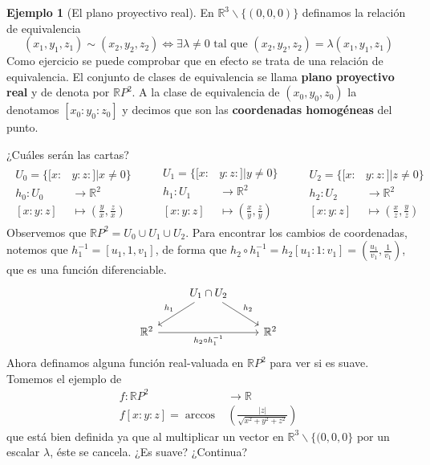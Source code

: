\documentclass[spanish]{book}
\theoremstyle{definition}
\newtheorem*{ejem}{Ejemplo}
\newcommand{\R}{\mathbb{R}}
\begin{document}
	\begin{ejem}[El plano proyectivo real]
		En $\R^3\backslash\{(0,0,0)\}$ definamos la relación de equivalencia
		\[(x_1,y_1,z_1)\sim(x_2,y_2,z_2)\iff\exists\lambda\neq0\text{ tal que }(x_2,y_2,z_2)=\lambda(x_1,y_1,z_1)\]
		Como ejercicio se puede comprobar que en efecto se trata de una relación de equivalencia. El conjunto de clases de equivalencia se llama \textbf{plano proyectivo real} y de denota por $\R P^2$. A la clase de equivalencia de $(x_0,y_0,z_0)$ la denotamos $[x_0:y_0:z_0]$ y decimos que son las \textbf{coordenadas homogéneas} del punto.
		
		¿Cuáles serán las cartas?
		\begin{align*}
			\begin{aligned}
				U_0=\{[x:&y:z:]|x\neq0\}\\
				h_0:U_0&\to\R^2\\
				[x:y:z]&\mapsto\left(\frac{y}{x},\frac{z}{x}\right)
			\end{aligned}\qquad
			\begin{aligned}
				U_1=\{[x:&y:z:]|y\neq0\}\\
				h_1:U_1&\to\R^2\\
				[x:y:z]&\mapsto\left(\frac{x}{y},\frac{z}{y}\right)
			\end{aligned}\qquad
			\begin{aligned}
				U_2=\{[x:&y:z:]|z\neq0\}\\
				h_2:U_2&\to\R^2\\
				[x:y:z]&\mapsto\left(\frac{x}{z},\frac{y}{z}\right)
			\end{aligned}
		\end{align*}
		Observemos que $\R P^2=U_0\cup U_1\cup U_2$. Para encontrar los cambios de coordenadas, notemos que $h_1^{-1}=[u_1,1,v_1]$, de forma que $h_2\circ h_1^{-1}=h_2[u_1:1:v_1]=\left(\frac{u_1}{v_1},\frac{1}{v_1}\right)$, que es una función diferenciable.
		\[\begin{tikzcd}
			&U_1\cap U_2\arrow[swap]{ld}{h_1}\arrow{rd}{h_2}\\
			\R^2\arrow[swap]{rr}{h_2\circ h_1^{-1}}&&\R^2
		\end{tikzcd}\]
		Ahora definamos alguna función real-valuada en $\R P^2$ para ver si es suave. Tomemos el ejemplo de
		\begin{align*}
			f:\R P^2&\to \R\\
			f[x:y:z]=\arccos&\left(\frac{|z|}{\sqrt{x^2+y^2+z^2}}\right)
		\end{align*}
		que está bien definida ya que al multiplicar un vector en $\R^3\backslash\{(0,0,0\}$ por un escalar $\lambda$, éste se cancela. ¿Es suave? ¿Continua?
		

\end{ejem}
\end{document}
